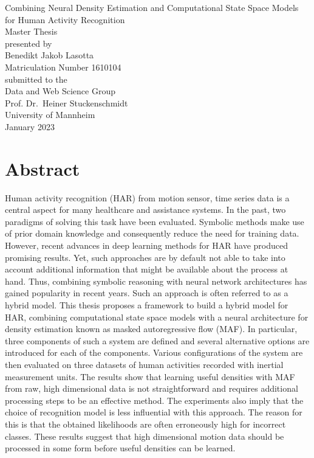 \documentclass[11pt,titlepage,oneside,openany]{book}
\begin{document}
\begin{titlepage}
	\vspace*{2cm}
  \begin{center}
   {\Large Combining Neural Density Estimation and Computational State Space Models for Human Activity Recognition\\}
   \vspace{2cm} 
   {Master Thesis\\}
   \vspace{2cm}
   {presented by\\
    Benedikt Jakob Lasotta \\
    Matriculation Number 1610104\\
   }
   \vspace{1cm} 
   {submitted to the\\
    Data and Web Science Group\\
    Prof. Dr.\ Heiner Stuckenschmidt\\
    University of Mannheim\\} \vspace{2cm}
   {January 2023}
  \end{center}
\end{titlepage}

\chapter*{Abstract}
Human activity recognition (HAR) from motion sensor, time series data is a central aspect for many healthcare and assistance systems. In the past, two paradigms of solving this task have been evaluated. Symbolic methods make use of prior domain knowledge and consequently reduce the need for training data. However, recent advances in deep learning methods for HAR have produced promising results. Yet, such approaches are by default not able to take into account additional information that might be available about the process at hand. Thus, combining symbolic reasoning with neural network architectures has gained popularity in recent years. Such an approach is often referred to as a hybrid model. This thesis proposes a framework to build a hybrid model for HAR, combining computational state space models with a neural architecture for density estimation known as masked autoregressive flow (MAF). In particular, three components of such a system are defined and several alternative options are introduced for each of the components. Various configurations of the system are then evaluated on three datasets of human activities recorded with inertial measurement units. The results show that learning useful densities with MAF from raw, high dimensional data is not straightforward and requires additional processing steps to be an effective method. The experiments also imply that the choice of recognition model is less influential with this approach. The reason for this is that the obtained likelihoods are often erroneously high for incorrect classes. These results suggest that high dimensional motion data should be processed in some form before useful densities can be learned.
\end{document}
